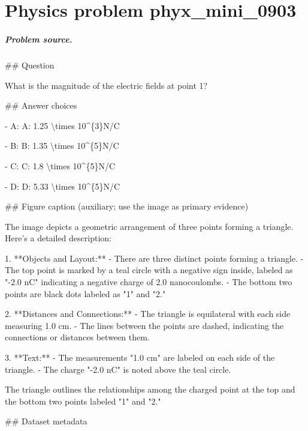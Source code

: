 
\chapter{Physics problem phyx\_mini\_0903}
\label{ch:PhyXMiniProblems_problem_phyx_mini_0903}

\paragraph{Problem source.}
\#\# Question

What is the magnitude of the electric fields at point 1?

\#\# Answer choices

- A: A: 1.25 \textbackslash{}times 10\textasciicircum{}\{3\}N/C

- B: B: 1.35 \textbackslash{}times 10\textasciicircum{}\{5\}N/C

- C: C: 1.8 \textbackslash{}times 10\textasciicircum{}\{5\}N/C

- D: D: 5.33 \textbackslash{}times 10\textasciicircum{}\{5\}N/C

\#\# Figure caption (auxiliary; use the image as primary evidence)

The image depicts a geometric arrangement of three points forming a triangle. Here's a detailed description:

1. **Objects and Layout:**
   - There are three distinct points forming a triangle.
   - The top point is marked by a teal circle with a negative sign inside, labeled as "-2.0 nC" indicating a negative charge of 2.0 nanocoulombs.
   - The bottom two points are black dots labeled as "1" and "2."

2. **Distances and Connections:**
   - The triangle is equilateral with each side measuring 1.0 cm. 
   - The lines between the points are dashed, indicating the connections or distances between them.

3. **Text:**
   - The measurements "1.0 cm" are labeled on each side of the triangle.
   - The charge "-2.0 nC" is noted above the teal circle.

The triangle outlines the relationships among the charged point at the top and the bottom two points labeled "1" and "2."

\#\# Dataset metadata

